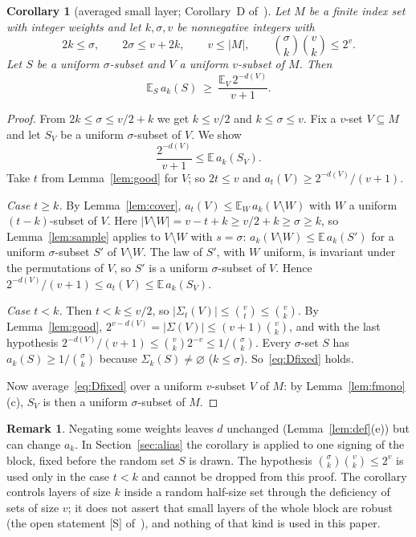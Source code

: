 \documentclass[11pt]{article}
\newtheorem{corollary}[lemma]{Corollary}
\theoremstyle{definition}
\newtheorem{remark}[lemma]{Remark}
\newcommand{\E}{\mathbb E}
\newcommand{\abs}[1]{\lvert #1\rvert}
\begin{document}
\begin{corollary}[averaged small layer; Corollary~D of~\cite{Base}]\label{cor:D}
Let $M$ be a finite index set with integer weights and let $k,\sigma,v$ be nonnegative integers with
\[
 2k\le\sigma,\qquad 2\sigma\le v+2k,\qquad v\le\abs M,\qquad \binom\sigma k\binom vk\le2^{v}.
\]
Let $S$ be a uniform $\sigma$-subset and $V$ a uniform $v$-subset of $M$. Then
\[
 \E_S\,a_k(S)\ \ge\ \frac{\E_V\,2^{-d(V)}}{v+1}.
\]
\end{corollary}
\begin{proof}
From $2k\le\sigma\le v/2+k$ we get $k\le v/2$ and $k\le\sigma\le v$. Fix a $v$-set $V\subseteq M$ and let $S_V$ be a
uniform $\sigma$-subset of $V$. We show
\begin{equation}\label{eq:Dfixed}
 \frac{2^{-d(V)}}{v+1}\le\E\,a_k(S_V).
\end{equation}
Take $t$ from Lemma~\ref{lem:good} for $V$; so $2t\le v$ and $a_t(V)\ge2^{-d(V)}/(v+1)$.

\emph{Case $t\ge k$.} By Lemma~\ref{lem:cover}, $a_t(V)\le\E_W\,a_k(V\setminus W)$ with $W$ a uniform
$(t-k)$-subset of $V$. Here $\abs{V\setminus W}=v-t+k\ge v/2+k\ge\sigma\ge k$, so Lemma~\ref{lem:sample} applies to
$V\setminus W$ with $s=\sigma$: $a_k(V\setminus W)\le\E\,a_k(S')$ for a uniform $\sigma$-subset $S'$ of
$V\setminus W$. The law of $S'$, with $W$ uniform, is invariant under the permutations of $V$, so $S'$ is a uniform
$\sigma$-subset of $V$. Hence $2^{-d(V)}/(v+1)\le a_t(V)\le\E\,a_k(S_V)$.

\emph{Case $t<k$.} Then $t<k\le v/2$, so $\abs{\Sigma_t(V)}\le\binom vt\le\binom vk$. By Lemma~\ref{lem:good},
$2^{v-d(V)}=\abs{\Sigma(V)}\le(v+1)\binom vk$, and with the last hypothesis
$2^{-d(V)}/(v+1)\le\binom vk2^{-v}\le1/\binom\sigma k$. Every $\sigma$-set $S$ has $a_k(S)\ge1/\binom\sigma k$ because
$\Sigma_k(S)\ne\varnothing$ ($k\le\sigma$). So~\eqref{eq:Dfixed} holds.

Now average~\eqref{eq:Dfixed} over a uniform $v$-subset $V$ of $M$: by Lemma~\ref{lem:fmono}(c), $S_V$ is then a
uniform $\sigma$-subset of $M$.
\end{proof}

\begin{remark}\label{rem:signs}
Negating some weights leaves $d$ unchanged (Lemma~\ref{lem:def}(e)) but can change $a_k$. In Section~\ref{sec:alias}
the corollary is applied to one signing of the block, fixed before the random set $S$ is drawn. The hypothesis
$\binom\sigma k\binom vk\le2^v$ is used only in the case $t<k$ and cannot be dropped from this proof. The
corollary controls layers of size $k$ inside a random half-size set through the deficiency of sets of size $v$; it
does not assert that small layers of the whole block are robust (the open statement \textup{[S]} of~\cite{V}), and
nothing of that kind is used in this paper.
\end{remark}
\end{document}
